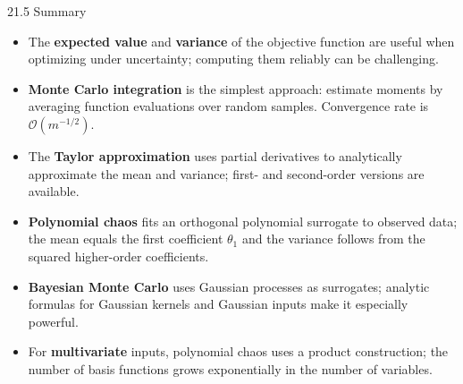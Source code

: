 \documentclass[aspectratio=169,10pt]{beamer}
\begin{document}
\begin{frame}{21.5 Summary}
  \begin{itemize}
    \setlength{\itemsep}{0.5em}
    \item The \textbf{expected value} and \textbf{variance} of the objective
          function are useful when optimizing under uncertainty; computing them
          reliably can be challenging.

    \item \textbf{Monte Carlo integration} is the simplest approach:
          estimate moments by averaging function evaluations over random samples.
          Convergence rate is $\mathcal{O}(m^{-1/2})$.

    \item The \textbf{Taylor approximation} uses partial derivatives to
          analytically approximate the mean and variance; first- and second-order
          versions are available.

    \item \textbf{Polynomial chaos} fits an orthogonal polynomial surrogate
          to observed data; the mean equals the first coefficient $\theta_1$
          and the variance follows from the squared higher-order coefficients.

    \item \textbf{Bayesian Monte Carlo} uses Gaussian processes as surrogates;
          analytic formulas for Gaussian kernels and Gaussian inputs make it
          especially powerful.

    \item For \textbf{multivariate} inputs, polynomial chaos uses a product
          construction; the number of basis functions grows exponentially
          in the number of variables.
  \end{itemize}
\end{frame}
\end{document}
